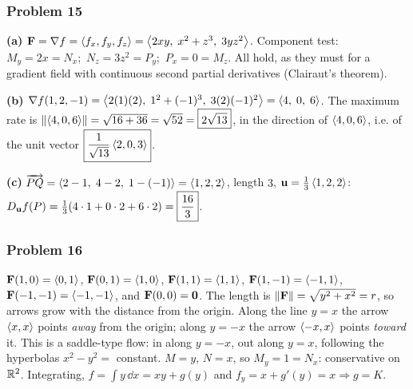 \subsubsection*{Problem 15}

\textbf{(a)} $\mathbf{F}=\nabla f=\left\langle f_x,f_y,f_z \right\rangle=\left\langle 2xy,\;x^2+z^3,\;3yz^2 \right\rangle$. Component test:
$M_y=2x=N_x$;\ $N_z=3z^2=P_y$;\ $P_x=0=M_z$. All hold, as they must for a gradient
field with continuous second partial derivatives (Clairaut's theorem).

\textbf{(b)} $\nabla f(1,2,-1)=\left\langle 2(1)(2),\;1^2+(-1)^3,\;3(2)(-1)^2 \right\rangle=\left\langle 4,\;0,\;6 \right\rangle$. The maximum rate is
$\lVert\left\langle 4,0,6 \right\rangle\rVert=\sqrt{16+36}=\sqrt{52}=\boxed{2\sqrt{13}}$, in the direction of
$\left\langle 4,0,6 \right\rangle$, i.e. of the unit vector $\boxed{\frac{1}{\sqrt{13}}\left\langle 2,0,3 \right\rangle}$.

\textbf{(c)} $\overrightarrow{PQ}=\left\langle 2-1,\;4-2,\;1-(-1) \right\rangle=\left\langle 1,2,2 \right\rangle$, length $3$, $\mathbf{u}=\frac13\left\langle 1,2,2 \right\rangle$:
$D_{\mathbf{u}} f(P)=\frac13(4\cdot1+0\cdot2+6\cdot2)=\boxed{\frac{16}{3}}$.

\subsubsection*{Problem 16}

 $\mathbf{F}(1,0)=\left\langle 0,1 \right\rangle$, $\mathbf{F}(0,1)=\left\langle 1,0 \right\rangle$, $\mathbf{F}(1,1)=\left\langle 1,1 \right\rangle$,
$\mathbf{F}(1,-1)=\left\langle -1,1 \right\rangle$, $\mathbf{F}(-1,-1)=\left\langle -1,-1 \right\rangle$, and $\mathbf{F}(0,0)=\mathbf{0}$.
 The length is $\lVert\mathbf{F}\rVert=\sqrt{y^2+x^2}=r$, so arrows grow with
the distance from the origin. Along the line $y=x$ the arrow $\left\langle x,x \right\rangle$ points
\emph{away} from the origin; along $y=-x$ the arrow $\left\langle -x,x \right\rangle$ points \emph{toward} it.
This is a saddle-type flow: in along $y=-x$, out along $y=x$, following the hyperbolas
$x^2-y^2=$ constant.
 $M=y$, $N=x$, so $M_y=1=N_x$: conservative on $\mathbb{R}^2$.
Integrating, $f=\int y\,\dd x=xy+g(y)$ and $f_y=x+g'(y)=x\Rightarrow g=K$.


